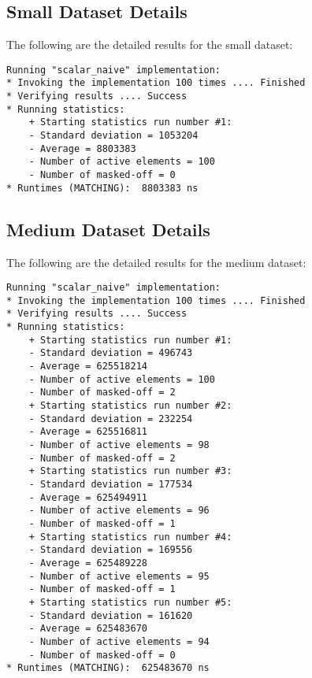 \documentclass[12pt]{article}
\begin{document}
\subsection{Small Dataset Details}
The following are the detailed results for the small dataset:
\begin{lstlisting}[caption=Small Dataset Execution Details, style=customc]
Running "scalar_naive" implementation:
* Invoking the implementation 100 times .... Finished
* Verifying results .... Success
* Running statistics:
    + Starting statistics run number #1:
    - Standard deviation = 1053204
    - Average = 8803383
    - Number of active elements = 100
    - Number of masked-off = 0
* Runtimes (MATCHING):  8803383 ns
\end{lstlisting}


\subsection{Medium Dataset Details}
The following are the detailed results for the medium dataset:
\begin{lstlisting}[caption=Medium Dataset Execution Details, style=customc]
Running "scalar_naive" implementation:
* Invoking the implementation 100 times .... Finished
* Verifying results .... Success
* Running statistics:
    + Starting statistics run number #1:
    - Standard deviation = 496743
    - Average = 625518214
    - Number of active elements = 100
    - Number of masked-off = 2
    + Starting statistics run number #2:
    - Standard deviation = 232254
    - Average = 625516811
    - Number of active elements = 98
    - Number of masked-off = 2
    + Starting statistics run number #3:
    - Standard deviation = 177534
    - Average = 625494911
    - Number of active elements = 96
    - Number of masked-off = 1
    + Starting statistics run number #4:
    - Standard deviation = 169556
    - Average = 625489228
    - Number of active elements = 95
    - Number of masked-off = 1
    + Starting statistics run number #5:
    - Standard deviation = 161620
    - Average = 625483670
    - Number of active elements = 94
    - Number of masked-off = 0
* Runtimes (MATCHING):  625483670 ns
\end{lstlisting}
\end{document}
